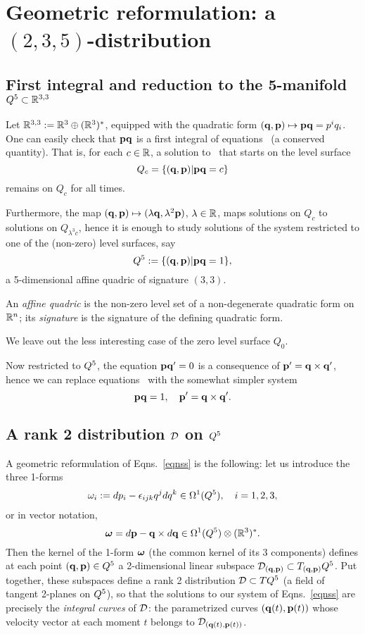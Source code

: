 
 
\section{Geometric reformulation: a $(2,3,5)$-distribution} 
\subsection{First integral and reduction to the 5-manifold $Q^5\subset \mathbb{R}^{3,3}$}\label{TwoOne}
Let $\mathbb{R}^{3,3}:=\mathbb{R}^3\oplus(\mathbb{R}^3)^*$, equipped with the quadratic form $(\mathbf q,{\mathbf p})\mapsto {\mathbf p}\mathbf q=p^iq_i$. 
One can easily check that  ${\mathbf p}\mathbf q$ is  a first integral of equations \eqns\ (a
conserved quantity). That is,  for each $c\in\mathbb{R}$, a solution to \eqns\ that starts on the   level surface $$Q_c=\{(\mathbf q,{\mathbf p})|{\mathbf p}\mathbf q=c\}$$ remains on
$Q_c$ for all times.  

Furthermore,  the map
$(\mathbf q,{\mathbf p})\mapsto (\lambda \mathbf q, \lambda^2 {\mathbf p})$, $\lambda\in\mathbb{R}$, maps
solutions on $Q_c$ to solutions on $Q_{\lambda^3c}$, hence it is
enough to study solutions of the system restricted to one of the 
(non-zero) level surfaces, say $$Q^5:=\{(\mathbf q,{\mathbf p})|{\mathbf p}\mathbf q=1\},$$ a 5-dimensional 
%
affine quadric
%
of signature
$ (3,3).$


\begin{rmrk} An {\em affine 
quadric}  is the non-zero  level set of a non-degenerate quadratic form on $\mathbb{R}^n$; its {\em signature}   is the signature of the defining quadratic form.
\end{rmrk}

\begin{rmrk}  We leave out the less interesting case of the zero level surface $Q_0$. 
\end{rmrk}

Now  restricted to $Q^5$,  the equation ${\mathbf p}\mathbf q'=0$ is a consequence of ${\mathbf p}'=\mathbf q\times\mathbf q'$, hence we can replace equations \eqns\ with 
the somewhat simpler system 
\begin{equation}\label{eqnss}
{\mathbf p}\mathbf q=1, \quad {\mathbf p}'=\mathbf q\times \mathbf q'.
\end{equation}

\subsection{A rank 2 distribution ${\mathcal D}$ on $Q^5$}\label{TwoTwo}
A geometric reformulation of  Eqns.~\eqref{eqnss} is the following: let us introduce the three 1-forms
$$\omega_i:=dp_i-\epsilon_{ijk}q^jdq^k\in\Omega^1(Q^5),\quad i=1,2,3,$$
or in vector notation,
$$\boldsymbol{\omega}=d{\mathbf p}-\mathbf q\times d\mathbf q\in\Omega^1(Q^5)\otimes(\mathbb{R}^3)^*.$$
%
Then the kernel of the 1-form $\boldsymbol{\omega}$ (the common kernel of its 3 components)  
defines  at each point $(\mathbf q,{\mathbf p})\in Q^5$ a 2-dimensional linear subspace  
${\mathcal D}_{(\mathbf q,{\mathbf p})}\subset T_{(\mathbf q,{\mathbf p})}Q^5$. Put together, these subspaces define 
a rank 2 distribution  ${\mathcal D}\subset TQ^5$  (a field of tangent 2-planes on $Q^5$),  
so that the solutions to our system of Eqns.~\eqref{eqnss} are precisely the 
{\em integral curves} of ${\mathcal D}$: the  parametrized curves $(\mathbf q(t) , {\mathbf p}(t) )$ 
whose velocity vector at each moment $t$  belongs to ${\mathcal D}_{(\mathbf q(t) ,{\mathbf p}(t) )}$.

